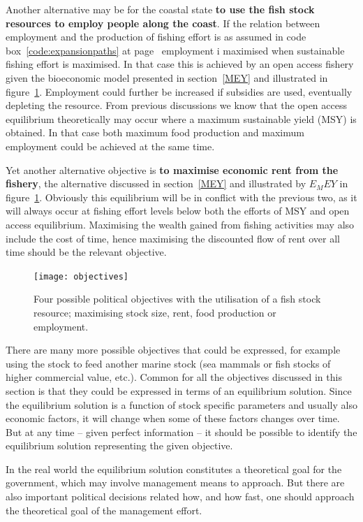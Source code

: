 \documentclass[11pt,fleqn]{book} %
\begin{document}
Another alternative may be for the coastal state \textbf{to use the fish stock resources to employ people along the coast}. If the relation between employment and the production of fishing effort is as assumed in code box~\ref{code:expansionpaths} at page~\pageref{code:expansionpaths} employment i maximised when sustainable fishing effort is maximised. In that case this is achieved by an open access fishery given the bioeconomic model presented in section~\ref{MEY} and illustrated in figure~\ref{fig:objectives}. Employment could further be increased if subsidies are used, eventually depleting the resource. From previous discussions we know that the open access equilibrium theoretically may occur where a maximum sustainable yield (MSY) is obtained. In that case both maximum food production and maximum employment could be achieved at the same time.

Yet another alternative objective is \textbf{to maximise economic rent from the fishery}, the alternative discussed in section~\ref{MEY} and illustrated by $E_MEY$ in figure~\ref{fig:objectives}. Obviously this equilibrium will be in conflict with the previous two, as it will always occur at fishing effort levels below both the efforts of MSY and open access equilibrium. Maximising the wealth gained from fishing activities may also include the cost of time, hence maximising the discounted flow of rent over all time should be the relevant objective.

\begin{figure}[ht]
\centering
\texttt{[image: objectives]}
\caption{Four possible political objectives with the utilisation of a fish stock resource; maximising stock size, rent, food production or employment.}
\label{fig:objectives}
\end{figure}

There are many more possible objectives that could be expressed, for example using the stock to feed another marine stock (sea mammals or fish stocks of higher commercial value, etc.). Common for all the objectives discussed in this section is that they could be expressed in terms of an equilibrium solution. Since the equilibrium solution is a function of stock specific parameters and usually also economic factors, it will change when some of these factors changes over time. But at any time -- given perfect information -- it should be possible to identify the equilibrium solution representing the given objective. 

In the real world the equilibrium solution constitutes a theoretical goal for the government, which may involve management means to approach. But there are also important political decisions related how, and how fast, one should approach the theoretical goal of the management effort.
\end{document}
